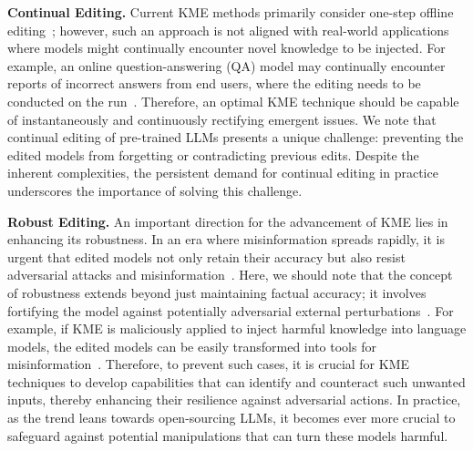 \documentclass[acmsmall, screen]{acmart}
\begin{document}
\vspace{0.05in}\noindent\textsf{\textbf{Continual Editing.}}
Current KME methods primarily consider one-step offline editing~\cite{cao2021editing,logan2022fruit}; however, such an approach is not aligned with real-world applications where models might continually encounter novel knowledge to be injected. 
For example, an online question-answering (QA) model may continually encounter reports of incorrect answers from end users, where the editing needs to be conducted on the run~\cite{Transformer-Patcher}. 
Therefore, an optimal KME technique should be capable of instantaneously and continuously rectifying emergent issues. We note that continual editing of pre-trained LLMs presents a unique challenge: preventing the edited models from forgetting or contradicting previous edits. Despite the inherent complexities, the persistent demand for continual editing in practice underscores the importance of solving this challenge.




\vspace{0.05in}\noindent\textsf{\textbf{Robust Editing.}}
An important direction for the advancement of KME lies in enhancing its robustness. In an era where misinformation spreads rapidly, it is urgent that edited models not only retain their accuracy but also resist adversarial attacks and misinformation~\cite{ganguli2022red}. Here, we should note that the concept of robustness extends beyond just maintaining factual accuracy; it involves fortifying the model against potentially adversarial external perturbations~\cite{perez2022red}. 
For example, if KME is maliciously applied to inject harmful knowledge into language models, the edited models can be easily transformed into tools for misinformation~\cite{alpaca}. Therefore, to prevent such cases, it is crucial for KME techniques to develop capabilities that can identify and counteract such unwanted inputs, thereby enhancing their resilience against adversarial actions.
In practice, as the trend leans towards open-sourcing LLMs, it becomes ever more crucial to safeguard against potential manipulations that can turn these models harmful.
\end{document}
